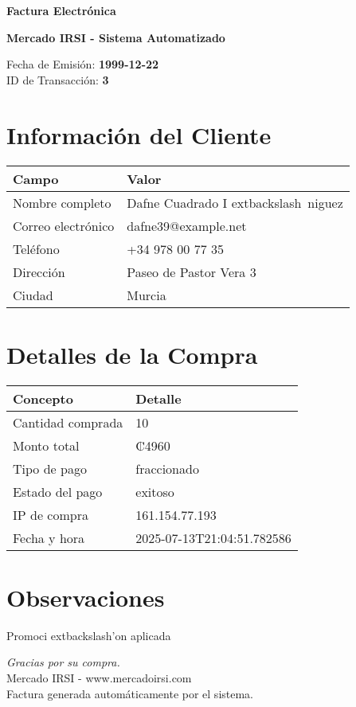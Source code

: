 \documentclass[10pt]{article}
\begin{document}
\begin{center}
    \Huge \textbf{Factura Electrónica}

    \vspace{0.3cm}
    \large \textbf{Mercado IRSI - Sistema Automatizado}

    \vspace{0.5cm}
    \normalsize Fecha de Emisión: \textbf{1999-12-22} \\
    ID de Transacción: \textbf{3} \\
\end{center}

\vspace{1cm}

\section*{Información del Cliente}
\begin{tabularx}{\textwidth}{>{\raggedright\arraybackslash}p{4cm} X}
\rowcolor{lightgray}
\textbf{Campo} & \textbf{Valor} \\
\hline
Nombre completo & Dafne Cuadrado I	extbackslash{}~{n}iguez \\
Correo electrónico & dafne39@example.net \\
Teléfono & +34 978 00 77 35 \\
Dirección & Paseo de Pastor Vera 3 \\
Ciudad & Murcia \\
\end{tabularx}

\vspace{0.8cm}

\section*{Detalles de la Compra}
\begin{tabularx}{\textwidth}{>{\raggedright\arraybackslash}p{6cm} X}
\rowcolor{lightgray}
\textbf{Concepto} & \textbf{Detalle} \\
\hline
Cantidad comprada & 10 \\
Monto total & ₡4960 \\
Tipo de pago & fraccionado \\
Estado del pago & exitoso \\
IP de compra & 161.154.77.193 \\
Fecha y hora & 2025-07-13T21:04:51.782586 \\
\end{tabularx}

\vspace{1.5cm}

\section*{Observaciones}
Promoci	extbackslash{}'{o}n aplicada

\vfill

\begin{center}
    \textit{Gracias por su compra.} \\
    Mercado IRSI - www.mercadoirsi.com \\
    Factura generada automáticamente por el sistema.
\end{center}
\end{document}
